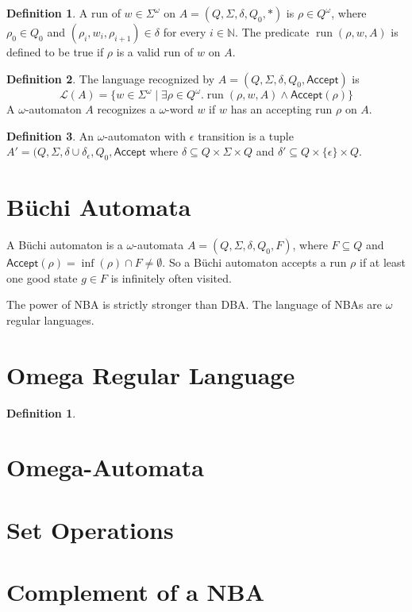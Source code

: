 \documentclass{article}
\theoremstyle{definition}
\newtheorem{definition}{Definition}
\newtheorem{subdef}{Definition}[definition]
\begin{document}
\begin{subdef}
	A run of \(w\in\Sigma^\omega\) on \(A=(Q,\Sigma,\delta,Q_0,\ast)\) is \(\rho\in Q^\omega\), where \(\rho_0\in Q_0\) and \((\rho_i,w_i,\rho_{i+1})\in\delta\) for every \(i\in\mathbb{N}\).
	The predicate \(\operatorname{run}(\rho,w,A)\) is defined to be true if \(\rho\) is a valid run of \(w\) on \(A\).
\end{subdef}

\begin{subdef}
	The language recognized by \(A=(Q,\Sigma,\delta,Q_0,\mathsf{Accept})\) is
	\[
		\mathcal{L}(A) = \{w\in\Sigma^\omega\mid
		\exists \rho\in Q^\omega .
		\operatorname{run}(\rho,w,A) \land \mathsf{Accept}(\rho)\}
	\]
	A \(\omega\)-automaton \(A\) recognizes a \(\omega\)-word \(w\) if \(w\) has an accepting run \(\rho\) on \(A\).
\end{subdef}

\begin{subdef}
	An \(\omega\)-automaton with \(\epsilon\) transition is a tuple \(A'=(Q,\Sigma,\delta\cup\delta_{\epsilon},Q_0,\mathsf{Accept}\) where \(\delta\subseteq Q\times\Sigma\times Q\) and \(\delta'\subseteq Q\times\{\epsilon\}\times Q\).

\end{subdef}

\section{B\"uchi Automata}

A B\"uchi automaton is a \(\omega\)-automata \(A=(Q,\Sigma,\delta,Q_0,F)\), where \(F\subseteq Q\) and \(\mathsf{Accept}(\rho) = \inf(\rho)\cap F \neq \emptyset\).
So a B\"uchi automaton accepts a run \(\rho\) if at least one good state \(g\in F\) is infinitely often visited.

The power of NBA is strictly stronger than DBA.
The language of NBAs are \(\omega\) regular languages.

\section{Omega Regular Language}

\begin{definition}
\end{definition}


\section{Omega-Automata}


\section{Set Operations}

\section{Complement of a NBA}
\end{document}
